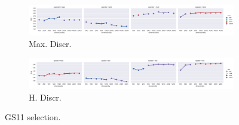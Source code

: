 \begin{landscape}
\begin{figure}
  \begin{subfigure}[t]{0.7\textwidth}
    \includegraphics[width=\textwidth]{supplement/figures/GS11-max_-selection-discr}
    \caption{Max. Discr.}
    \label{fig:}
  \end{subfigure}
  \begin{subfigure}[t]{0.7\textwidth}
    \includegraphics[width=\textwidth]{supplement/figures/GS11-heuristics-selection-discr}
    \caption{H. Discr.}
    \label{fig:}
  \end{subfigure}

  \caption{GS11 selection.}
  \label{fig:selection_gs11}
\end{figure}

\end{landscape}

\restoregeometry

